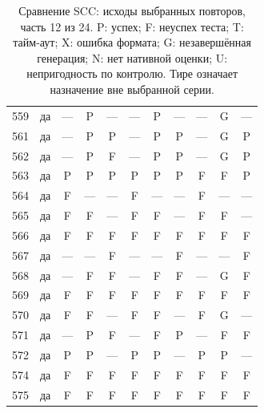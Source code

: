 \begin{table}[p]
\begin{tabular*}{\textwidth}{@{\extracolsep{\fill}}rc*{9}{c}@{}}
559 & да & — & P & — & — & P & — & — & G & —\\
561 & да & — & P & P & — & P & P & — & G & P\\
562 & да & — & P & F & — & P & P & — & G & P\\
563 & да & P & P & P & P & P & P & F & F & P\\
564 & да & F & — & — & F & — & — & F & — & —\\
565 & да & F & F & — & F & F & — & F & F & —\\
566 & да & F & F & F & F & F & F & F & F & F\\
567 & да & — & — & F & — & — & F & — & — & F\\
568 & да & — & F & F & — & F & F & — & G & F\\
569 & да & F & F & F & F & F & F & F & F & F\\
570 & да & F & F & — & F & F & — & F & G & —\\
571 & да & — & P & F & — & F & P & — & F & F\\
572 & да & P & P & — & P & P & — & P & P & —\\
574 & да & F & F & F & F & F & F & F & F & F\\
575 & да & F & F & F & F & F & F & F & F & F\\
\bottomrule\end{tabular*}
\caption{Сравнение SCC: исходы выбранных повторов, часть 12 из 24. P: успех; F: неуспех теста; T: тайм-аут; X: ошибка формата; G: незавершённая генерация; N: нет нативной оценки; U: непригодность по контролю. Тире означает назначение вне выбранной серии.}
\end{table}
\clearpage
